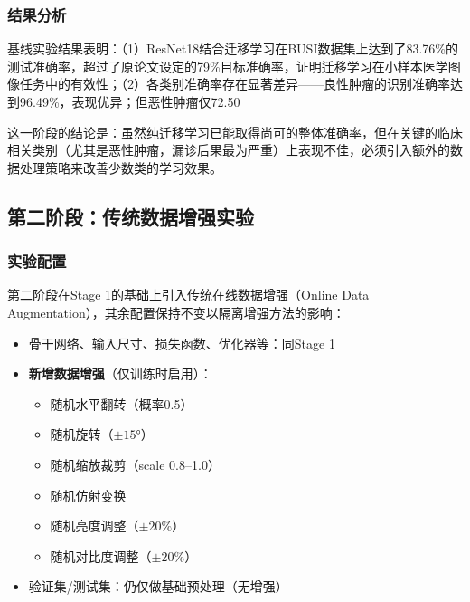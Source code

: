 \subsubsection{结果分析}

基线实验结果表明：（1）ResNet18结合迁移学习在BUSI数据集上达到了83.76\%的测试准确率，超过了原论文设定的79\%目标准确率，证明迁移学习在小样本医学图像任务中的有效性；（2）各类别准确率存在显著差异——良性肿瘤的识别准确率达到96.49\%，表现优异；但恶性肿瘤仅72.50%

这一阶段的结论是：虽然纯迁移学习已能取得尚可的整体准确率，但在关键的临床相关类别（尤其是恶性肿瘤，漏诊后果最为严重）上表现不佳，必须引入额外的数据处理策略来改善少数类的学习效果。


\subsection{第二阶段：传统数据增强实验}

\subsubsection{实验配置}

第二阶段在Stage 1的基础上引入传统在线数据增强（Online Data Augmentation），其余配置保持不变以隔离增强方法的影响：

\begin{itemize}
    \item 骨干网络、输入尺寸、损失函数、优化器等：同Stage 1
    \item \textbf{新增数据增强}（仅训练时启用）：
    \begin{itemize}
        \item 随机水平翻转（概率0.5）
        \item 随机旋转（$\pm15°$）
        \item 随机缩放裁剪（scale 0.8--1.0）
        \item 随机仿射变换
        \item 随机亮度调整（$\pm20\%$）
        \item 随机对比度调整（$\pm20\%$）
    \end{itemize}
    \item 验证集/测试集：仍仅做基础预处理（无增强）
\end{itemize}

